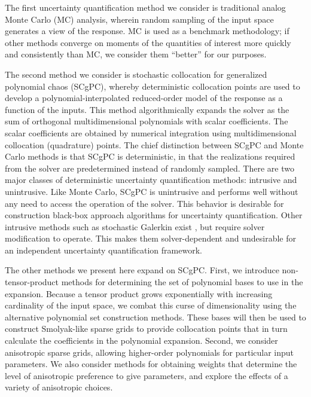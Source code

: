 The first uncertainty quantification method we consider
is traditional analog Monte Carlo (MC) analysis, wherein random sampling of the input space generates a view of
the response.  MC is used as a benchmark methodology; if other methods converge on moments of the quantities
of interest more quickly and consistently than MC, we consider them ``better'' for our purposes.

The second method we consider is stochastic collocation for generalized polynomial
chaos (SCgPC)\cite{sparseSC,sparse1,sparse2,xiu}, whereby deterministic collocation points 
are used to develop a polynomial-interpolated reduced-order model
of the response as a function of the inputs.  This method algorithmically expands the solver as the sum of
orthogonal multidimensional polynomials with scalar coefficients.  The scalar coefficients are obtained by
numerical integration using multidimensional collocation (quadrature) points.  The chief distinction between
SCgPC and Monte Carlo methods is that SCgPC is deterministic, in that the realizations required from the
solver are predetermined instead of randomly sampled.  There are two major classes of deterministic
uncertainty quantification methods: intrusive and unintrusive.  Like Monte Carlo, SCgPC is unintrusive
and performs well without any need to access the operation of the solver.  This behavior is desirable for
construction black-box approach algorithms for uncertainty quantification.  Other intrusive methods such as
stochastic Galerkin exist \cite{galerkin}, but require solver modification to operate.  This makes them
solver-dependent and undesirable for an independent uncertainty quantification framework.

The other methods we present here expand on
SCgPC.  First, we introduce non-tensor-product methods for determining the set of polynomial bases to
use in the expansion.  Because a tensor product grows exponentially with increasing cardinality of the input
space, we combat this curse of dimensionality using the 
alternative polynomial set construction methods\cite{hctd}.
These bases will then be used to construct Smolyak-like sparse grids \cite{smolyak} to provide collocation
points that in turn calculate the coefficients in the polynomial expansion.  Second, we consider
anisotropic sparse grids,
allowing higher-order polynomials for particular input parameters.  We also consider methods for
obtaining weights that determine the level of anisotropic preference to give parameters, and explore the effects of a
variety of anisotropic choices.

